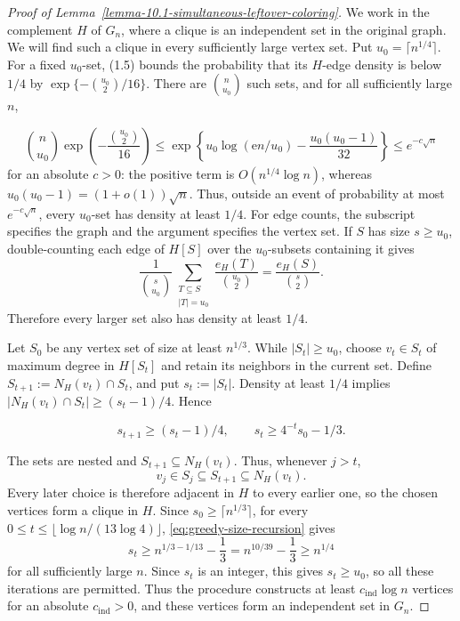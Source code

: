 \documentclass[a4paper,10pt,reqno]{amsart}
\numberwithin{equation}{section}
\theoremstyle{plain}
\theoremstyle{remark}
\begin{document}
\begin{proof}[Proof of Lemma~\ref{lemma-10.1-simultaneous-leftover-coloring}]
We work in the complement \(H\) of \(G_n\), where a clique is an
independent set in the original graph. We will find such a clique in
every sufficiently large vertex set. Put
\(u_0=\lceil n^{1/4}\rceil\). For a fixed \(u_0\)-set, (1.5) bounds the
probability that its \(H\)-edge density is below \(1/4\) by
\(\exp\{-\binom{u_0}{2}/16\}\). There are
\(\binom n{u_0}\) such sets, and for all sufficiently large \(n\),

\[
 \binom n{u_0}\exp\!\left(-\frac{\binom{u_0}{2}}{16}\right)
 \le\exp\!\left\{u_0\log(\mathrm{e} n/u_0)
                 -\frac{u_0(u_0-1)}{32}\right\}
 \le e^{-c\sqrt n}
\]
for an absolute \(c>0\): the positive term is \(O(n^{1/4}\log n)\),
whereas \(u_0(u_0-1)=(1+o(1))\sqrt n\).
Thus, outside an event of probability at most
\(e^{-c\sqrt n}\), every \(u_0\)-set has density at least \(1/4\).
For edge counts, the subscript specifies the graph and the argument
specifies the vertex set. If \(S\) has size \(s\ge u_0\), double-counting each edge of
\(H[S]\) over the \(u_0\)-subsets containing it gives
\[
 \frac{1}{\binom{s}{u_0}}
 \sum_{\substack{T\subseteq S\\|T|=u_0}}
 \frac{e_H(T)}{\binom{u_0}{2}}
 =\frac{e_H(S)}{\binom{s}{2}}.
\]
Therefore every larger set also has density at least \(1/4\).

Let $S_0$ be any vertex set of size at least \(n^{1/3}\). While
$|S_t|\ge u_0$, choose $v_t\in S_t$ of maximum degree in $H[S_t]$ and retain
its neighbors in the current set. Define
$S_{t+1}:=N_H(v_t)\cap S_t$, and put $s_t:=|S_t|$.
Density at least \(1/4\) implies
$|N_H(v_t)\cap S_t|\ge(s_t-1)/4$. Hence

\begin{equation}
 s_{t+1}\ge(s_t-1)/4,\qquad s_t\ge4^{-t}s_0-1/3.         \label{eq:greedy-size-recursion}
\end{equation}

The sets are nested and $S_{t+1}\subseteq N_H(v_t)$. Thus, whenever $j>t$,
\[
  v_j\in S_j\subseteq S_{t+1}\subseteq N_H(v_t).
\]
Every later choice is therefore adjacent in $H$ to every earlier one, so the
chosen vertices form a clique in $H$. Since \(s_0\ge\lceil n^{1/3}\rceil\), for every
\(0\le t\le\lfloor {\log n}/(13\log4)\rfloor\), \eqref{eq:greedy-size-recursion} gives
\[
 s_t\ge n^{1/3-1/13}-\frac13
      =n^{10/39}-\frac13
      \ge n^{1/4}
\]
for all sufficiently large \(n\). Since \(s_t\) is an integer, this gives
\(s_t\ge u_0\), so all these iterations are permitted. Thus the procedure
constructs at least \(c_{\mathrm{ind}}\log n\) vertices for an absolute
\(c_{\mathrm{ind}}>0\), and these vertices form an independent set in
\(G_n\).


\end{proof}
\end{document}
